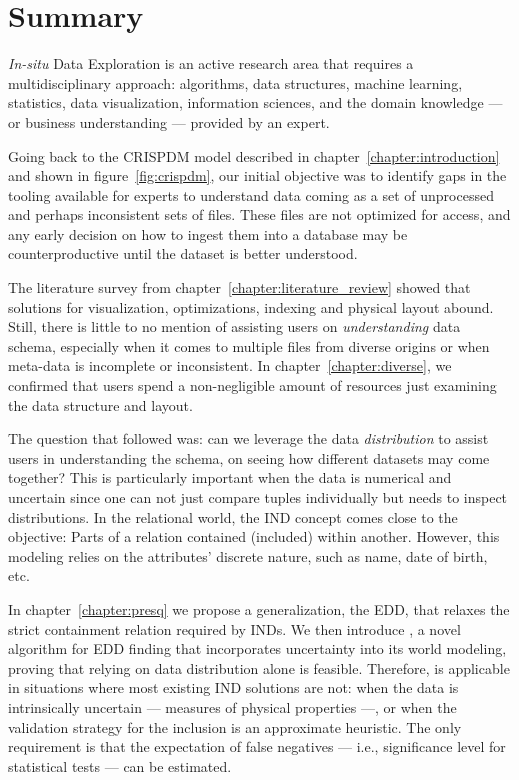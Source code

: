 \section{Summary}

\emph{In-situ} Data Exploration is an active research area that requires
a multidisciplinary approach: algorithms, data structures, machine learning,
statistics,  data visualization, information sciences, and the domain knowledge
--- or business understanding ---  provided by an expert.

Going back to the \gls{CRISPDM} model described in  chapter~\ref{chapter:introduction}
and shown in figure~\ref{fig:crispdm}, our initial objective was to identify
gaps in the tooling available for experts to understand data coming as a set of
unprocessed and perhaps inconsistent sets of files. These files are not optimized
for access, and any early decision on how to ingest them into a database may be
counterproductive until the dataset is better understood.

The literature survey from chapter~\ref{chapter:literature_review} showed that
solutions for visualization, optimizations, indexing and physical layout abound.
Still, there is little to no mention of assisting users on \emph{understanding}
data schema, especially when it comes to multiple files from diverse origins or
when meta-data is incomplete or inconsistent.
In chapter~\ref{chapter:diverse}, we confirmed that users spend a non-negligible
amount of resources just examining the data structure and layout.

The question that followed was: can we leverage the data \emph{distribution} to
assist users in understanding the schema, on seeing how different datasets may come together?
This is particularly important when the data is numerical and uncertain since
one can not just compare tuples individually but needs to inspect distributions.
In the relational world, the \gls{IND} concept comes close to the objective:
Parts of a relation contained (included) within another. However, this modeling
relies on the attributes' discrete nature, such as name, date of birth, etc.

In chapter~\ref{chapter:presq} we propose a generalization, the \gls{EDD}, that
relaxes the strict containment relation required by \glspl{IND}.
We then introduce \PresQ, a novel algorithm for \gls{EDD} finding that incorporates
uncertainty into its world modeling, proving that relying on data distribution alone is feasible.
Therefore, \PresQ is applicable in situations where most existing \gls{IND} solutions
are not: when the data is intrinsically uncertain --- measures of physical properties ---,
or when the validation strategy for the inclusion is an approximate heuristic.
The only requirement is that the expectation of false negatives --- i.e., significance
level for statistical tests --- can be estimated.

